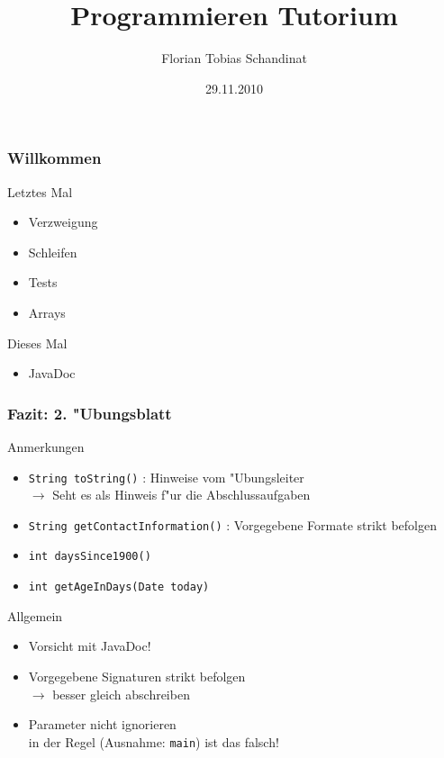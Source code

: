 \documentclass{beamer}
\title{Programmieren Tutorium}
\author{Florian Tobias Schandinat}
\date{29.11.2010}
\institute{FTS}
\begin{document}
\begin{frame}
\frametitle{Willkommen}
\pause
\begin{alertblock}{Letztes Mal}
\begin{itemize}
\item Verzweigung
\item Schleifen
\item Tests
\item Arrays
\end{itemize}
\end{alertblock}

\pause

\begin{block}{Dieses Mal}
\begin{itemize}
\item JavaDoc
\end{itemize}
\end{block}
\end{frame}


\begin{frame}
\frametitle{Fazit: 2. "Ubungsblatt}
\begin{block}{Anmerkungen}
\begin{itemize}
\item \lstinline|String toString()| : Hinweise vom "Ubungsleiter\\
$\rightarrow$ Seht es als Hinweis f"ur die Abschlussaufgaben\pause
\item \lstinline|String getContactInformation()| : Vorgegebene Formate strikt befolgen\pause
\item \lstinline|int daysSince1900()|\pause
\item \lstinline|int getAgeInDays(Date today)|
\end{itemize}
\end{block}

\pause

\begin{block}{Allgemein}
\begin{itemize}
\item Vorsicht mit JavaDoc!
\item Vorgegebene Signaturen strikt befolgen\\
$\rightarrow$ besser gleich abschreiben
\item Parameter nicht ignorieren\\
in der Regel (Ausnahme: \texttt{main}) ist das falsch! 
\end{itemize}
\end{block}
\end{frame}
\end{document}
